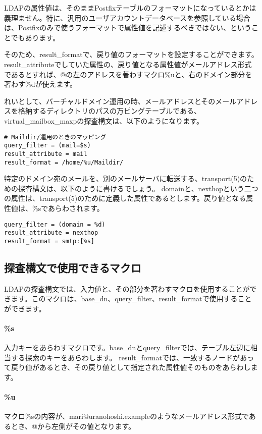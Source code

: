 LDAPの属性値は、そのままPostfixテーブルのフォーマットになっているとかは義理ません。特に、汎用のユーザアカウントデータベースを参照している場合は、Postfixのみで使うフォーマットで属性値を記述するべきではない、ということでもあります。

そのため、result\_formatで、戻り値のフォーマットを設定することができます。result\_attributeでしていた属性の、戻り値となる属性値がメールアドレス形式であるとすれば、@の左のアドレスを著わすマクロ\%uと、右のドメイン部分を著わす\%dが使えます。

れいとして、バーチャルドメイン運用の時、メールアドレスとそのメールアドレスを格納するディレクトリのパスの万ピングテーブルである、virtual\_mailbox\_maxpの探査構文は、以下のようになります。

\begin{verbatim}
# Maildir/運用のときのマッピング
query_filter = (mail=$s)
result_attribute = mail
result_format = /home/%u/Maildir/
\end{verbatim}

特定のドメイン宛のメールを、別のメールサーバに転送する、transport(5)のための探査構文は、以下のように書けるでしょう。
domainと、nexthopという二つの属性は、transport(5)のために定義した属性であるとします。戻り値となる属性値は、\%sであらわされます。

\begin{verbatim}
query_filter = (domain = %d)
result_attribute = nexthop
result_format = smtp:[%s]
\end{verbatim}

\subsection{探査構文で使用できるマクロ}

LDAPの探査構文では、入力値と、その部分を著わすマクロを使用することができます。このマクロは、base\_dn、query\_filter、result\_formatで使用することができます。

\paragraph{\%s}
入力キーをあらわすマクロです。base\_dnとquery\_filterでは、テーブル左辺に相当する探索のキーをあらわします。
result\_formatでは、一致するノードがあって戻り値があるとき、その戻り値として指定された属性値そのものをあらわします。

\paragraph{\%u}
マクロ\%sの内容が、mari@uranohoshi.exampleのようなメールアドレス形式であるとき、@から左側がその値となります。


